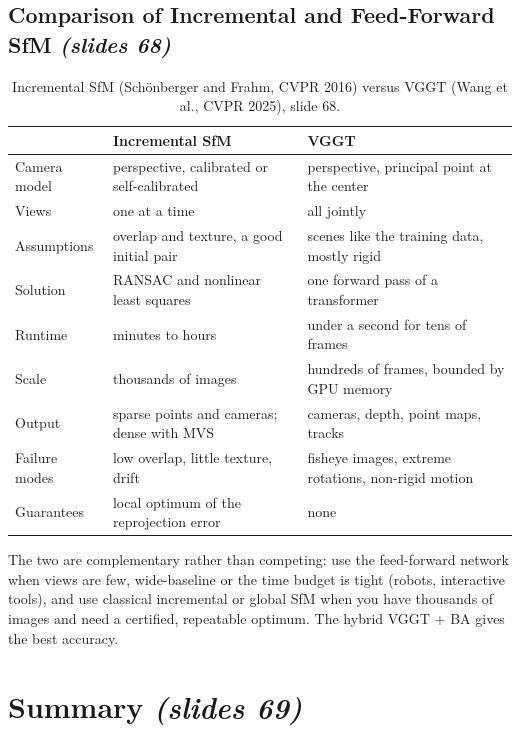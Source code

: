 \documentclass[11pt,a4paper]{article}
\newcommand{\slr}[1]{\texorpdfstring{\emph{(slides #1)}}{(slides #1)}}
\theoremstyle{definition}
\theoremstyle{plain}
\theoremstyle{remark}
\begin{document}
\subsection{Comparison of Incremental and Feed-Forward SfM \slr{68}}
\begin{table}[H]
\centering
\small
\begin{tabular}{@{}p{2.6cm}p{5.8cm}p{5.8cm}@{}}
\toprule
 & Incremental SfM & VGGT\\
\midrule
Camera model & perspective, calibrated or self-calibrated & perspective, principal point at the center\\
Views & one at a time & all jointly\\
Assumptions & overlap and texture, a good initial pair & scenes like the training data, mostly rigid\\
Solution & RANSAC and nonlinear least squares & one forward pass of a transformer\\
Runtime & minutes to hours & under a second for tens of frames\\
Scale & thousands of images & hundreds of frames, bounded by GPU memory\\
Output & sparse points and cameras; dense with MVS & cameras, depth, point maps, tracks\\
Failure modes & low overlap, little texture, drift & fisheye images, extreme rotations, non-rigid motion\\
Guarantees & local optimum of the reprojection error & none\\
\bottomrule
\end{tabular}
\caption{Incremental SfM (Sch\"onberger and Frahm, CVPR 2016) versus VGGT (Wang et al., CVPR 2025), slide 68.}
\end{table}

\begin{intuition}
The two are complementary rather than competing: use the feed-forward network when views are few, wide-baseline or the time budget is tight (robots, interactive tools), and use classical incremental or global SfM when you have thousands of images and need a certified, repeatable optimum. The hybrid VGGT + BA gives the best accuracy.
\end{intuition}

\section*{Summary \slr{69}}
\end{document}
